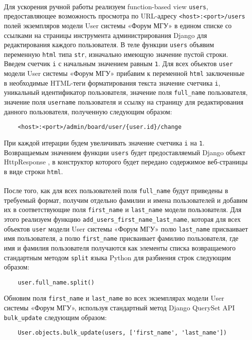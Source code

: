 \documentclass[12pt, a4paper, oneside]{article}
\begin{document}
\paragraph{}
Для ускорения ручной работы реализуем function-based view \texttt{users}, предоставляющее возможность просмотра по URL-адресу \texttt{<host>:<port>/users} полей экземпляров модели User системы «Форум МГУ» в едином списке со ссылками на страницы инструмента администрирования Django для редактирования каждого пользователя. В теле функции \texttt{users} объявим переменную \texttt{html} типа \texttt{str}, изначально имеющую значение пустой строки. Введем счетчик \texttt{i} с начальным значением равным \texttt{1}. Для всех объектов \texttt{user} модели User системы «Форум МГУ» прибавим к переменной \texttt{html} заключенные в необходимые HTML-теги форматирования текста значение счетчика \texttt{i}, уникальный идентификатор пользователя, значение поля \texttt{full\_name} пользователя, значение поля \texttt{username} пользователя и ссылку на страницу для редактирования данного пользователя, полученную следующим образом:
\begin{verbatim}
    <host>:<port>/admin/board/user/{user.id}/change
\end{verbatim}
При каждой итерации будем увеличивать значение счетчика \texttt{i} на \texttt{1}. Возвращаемым значением функции \texttt{users} будет предоставляемый Django объект HttpResponse \cite{django-httpresponse}, в конструктор которого будет передано содержимое веб-страницы в виде строки \texttt{html}.
\paragraph{}
После того, как для всех пользователей поля \texttt{full\_name} будут приведены в требуемый формат, получим отдельно фамилии и имена пользователей и добавим их в соответствующие поля \texttt{first\_name} и \texttt{last\_name} модели пользователя. Для этого реализуем функцию \texttt{add\_users\_first\_name\_last\_name}, которая для всех объектов \texttt{user} модели User системы «Форум МГУ» полю \texttt{last\_name} присваивает имя пользователя, а полю \texttt{first\_name} присваивает фамилию пользователя, где имя и фамилия пользователя получаются как элементы списка возвращаемого стандартным методом \texttt{split} языка Python для разбиения строк следующим образом:
\begin{verbatim}
    user.full_name.split()
\end{verbatim}
Обновим поля \texttt{first\_name} и \texttt{last\_name} во всех экземплярах модели User системы «Форум МГУ», используя стандартный метод Django QuerySet API \texttt{bulk\_update} следующим образом:
\begin{verbatim}
    User.objects.bulk_update(users, ['first_name', 'last_name'])
\end{verbatim}
\end{document}

